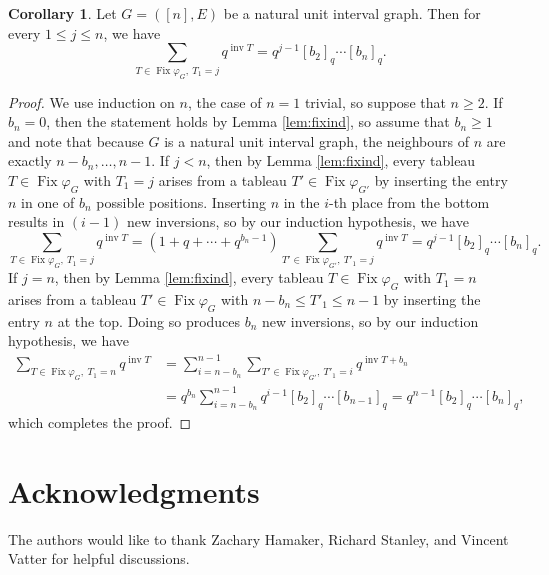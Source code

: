 \documentclass[10pt,a4paper]{amsart}
\theoremstyle{definition}
\newtheorem{corollary}[theorem]{Corollary}
\theoremstyle{remark}
\numberwithin{equation}{section}
\DeclareMathOperator{\inv}{inv}
\DeclareMathOperator{\Fix}{Fix}
\begin{document}
\begin{corollary}
\label{qcor}
Let $G=([n],E)$ be a natural unit interval graph. Then for every $1\leq j\leq n$, we have
\begin{equation}
\sum_{T\in\Fix\varphi_G, \ T_1=j}q^{\inv T}=q^{j-1}[b_2]_q\cdots[b_n]_q.
\end{equation}
\end{corollary}

\begin{proof}
We use induction on $n$, the case of $n=1$ trivial, so suppose that $n\geq 2$. If $b_n=0$, then the statement holds by Lemma \ref{lem:fixind}, so assume that $b_n\geq 1$ and note that because $G$ is a natural unit interval graph, the neighbours of $n$ are exactly $n-b_n,\ldots,n-1$. If $j<n$, then by Lemma \ref{lem:fixind}, every tableau $T\in\Fix\varphi_G$ with $T_1=j$ arises from a tableau $T'\in\Fix\varphi_{G'}$ by inserting the entry $n$ in one of $b_n$ possible positions. Inserting $n$ in the $i$-th place from the bottom results in $(i-1)$ new inversions, so by our induction hypothesis, we have
$$\sum_{T\in\Fix\varphi_G, \ T_1=j}q^{\inv T}=(1+q+\cdots+q^{b_n-1})\sum_{T'\in\Fix\varphi_{G'}, \ T'_1=j}q^{\inv T}=q^{j-1}[b_2]_q\cdots[b_n]_q.$$
If $j=n$, then by Lemma \ref{lem:fixind}, every tableau $T\in\Fix\varphi_G$ with $T_1=n$ arises from a tableau $T'\in\Fix\varphi_G$ with $n-b_n\leq T'_1\leq n-1$ by inserting the entry $n$ at the top. Doing so produces $b_n$ new inversions, so by our induction hypothesis, we have
\begin{align*}\sum_{T\in\Fix\varphi_G, \ T_1=n}q^{\inv T}&=\sum_{i=n-b_n}^{n-1}\sum_{T'\in\Fix\varphi_{G'}, \ T'_1=i}q^{\inv T+b_n}\\&=q^{b_n}\sum_{i=n-b_n}^{n-1}q^{i-1}[b_2]_q\cdots[b_{n-1}]_q=q^{n-1}[b_2]_q\cdots[b_n]_q,\end{align*}
which completes the proof.
\end{proof}

\section{Acknowledgments}
The authors would like to thank Zachary Hamaker, Richard Stanley, and Vincent Vatter for helpful discussions.

\nocite{*}

\printbibliography
\end{document}
